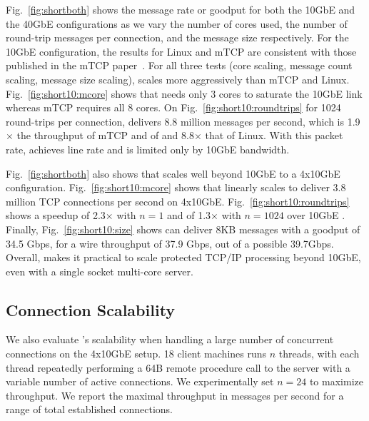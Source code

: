 


Fig.~\ref{fig:shortboth} shows the message
rate or goodput for both the 10GbE and the 40GbE configurations as we
vary the number of cores used, the number of round-trip messages per
connection, and the message size respectively.  For the 10GbE
configuration, the results for Linux and mTCP are consistent with
those published in the mTCP paper~\cite{jeong2014mtcp}.  For all three
tests (core scaling, message count scaling, message size scaling), \ix
scales more aggressively than mTCP and
Linux. Fig.~\ref{fig:short10:mcore} shows that \ix needs only 3 cores
to saturate the 10GbE link whereas mTCP requires all 8 cores. On
Fig.~\ref{fig:short10:roundtrips} for 1024 round-trips per connection,
\ix delivers 8.8 million messages per second, which is
1.9$\times$ the throughput of mTCP and of and 8.8$\times$ that of
Linux. With this packet rate, \ix achieves line rate and is limited
only by 10GbE bandwidth.





Fig.~\ref{fig:shortboth} also shows that \ix
scales well beyond 10GbE to a 4x10GbE configuration.
Fig.~\ref{fig:short10:mcore} shows that \ix linearly scales to deliver
3.8 million TCP connections per second on 4x10GbE.
Fig.~\ref{fig:short10:roundtrips} shows a speedup of 2.3$\times$ with $n=1$
and of 1.3$\times$ with $n=1024$ over 10GbE \ix.  Finally,
Fig.~\ref{fig:short10:size} shows \ix can deliver 8KB messages with a
goodput of 34.5 Gbps, for a wire throughput of
37.9 Gbps, out of a possible 39.7Gbps.  Overall, \ix makes
it practical to scale protected TCP/IP processing beyond 10GbE, even
with a single socket multi-core server.



\subsection{Connection Scalability}
\label{sec:eval:scale}



We also evaluate \ix's scalability when handling a large number of
concurrent connections on the 4x10GbE setup. 18 client
machines runs $n$ threads, with each thread repeatedly performing a
64B remote procedure call to the server with a variable number of
active connections. %
We experimentally set $n=24$ to maximize
throughput.  We report the maximal throughput in messages per second
for a range of total established connections.

